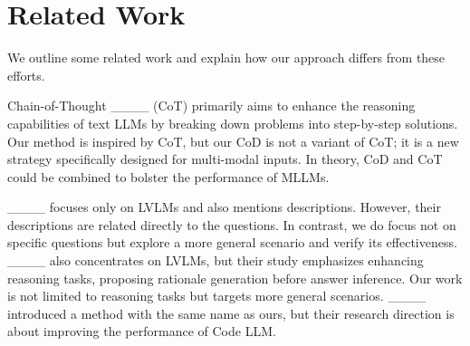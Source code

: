 \section{Related Work}
We outline some related work and explain how our approach differs from these efforts.

Chain-of-Thought ____ (CoT) primarily aims to enhance the reasoning capabilities of text LLMs by breaking down problems into step-by-step solutions. Our method is inspired by CoT, but our CoD is not a variant of CoT; it is a new strategy specifically designed for multi-modal inputs. In theory, CoD and CoT could be combined to bolster the performance of MLLMs.

____ focuses only on LVLMs and also mentions descriptions. However, their descriptions are related directly to the questions. In contrast, we do focus not on specific questions but explore a more general scenario and verify its effectiveness.
____ also concentrates on LVLMs, but their study emphasizes enhancing reasoning tasks, proposing rationale generation before answer inference. Our work is not limited to reasoning tasks but targets more general scenarios. 
____ introduced a method with the same name as ours, but their research direction is about improving the performance of Code LLM.